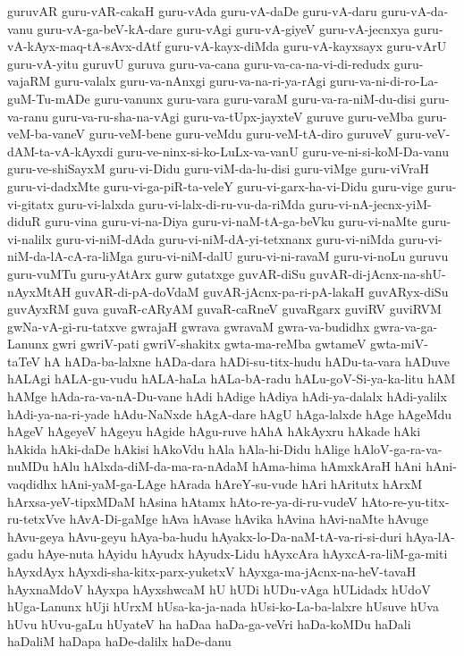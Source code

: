 {guruvAR
guru-vAR-cakaH
guru-vAda
guru-vA-daDe
guru-vA-daru
guru-vA-da-vanu
guru-vA-ga-beV-kA-dare
guru-vAgi
guru-vA-giyeV
guru-vA-jecnxya
guru-vA-kAyx-maq-tA-sAvx-dAtf
guru-vA-kayx-diMda
guru-vA-kayxsayx
guru-vArU
guru-vA-yitu
guruvU
guruva
guru-va-cana
guru-va-ca-na-vi-di-redudx
guru-vajaRM
guru-valalx
guru-va-nAnxgi
guru-va-na-ri-ya-rAgi
guru-va-ni-di-ro-La-guM-Tu-mADe
guru-vanunx
guru-vara
guru-varaM
guru-va-ra-niM-du-disi
guru-va-ranu
guru-va-ru-sha-na-vAgi
guru-va-tUpx-jayxteV
guruve
guru-veMba
guru-veM-ba-vaneV
guru-veM-bene
guru-veMdu
guru-veM-tA-diro
guruveV
guru-veV-dAM-ta-vA-kAyxdi
guru-ve-ninx-si-ko-LuLx-va-vanU
guru-ve-ni-si-koM-Da-vanu
guru-ve-shiSayxM
guru-vi-Didu
guru-viM-da-lu-disi
guru-viMge
guru-viVraH
guru-vi-dadxMte
guru-vi-ga-piR-ta-veleY
guru-vi-garx-ha-vi-Didu
guru-vige
guru-vi-gitatx
guru-vi-lalxda
guru-vi-lalx-di-ru-vu-da-riMda
guru-vi-nA-jecnx-yiM-diduR
guru-vina
guru-vi-na-Diya
guru-vi-naM-tA-ga-beVku
guru-vi-naMte
guru-vi-nalilx
guru-vi-niM-dAda
guru-vi-niM-dA-yi-tetxnanx
guru-vi-niMda
guru-vi-niM-da-lA-cA-ra-liMga
guru-vi-niM-dalU
guru-vi-ni-ravaM
guru-vi-noLu
guruvu
guru-vuMTu
guru-yAtArx
gurw
gutatxge
guvAR-diSu
guvAR-di-jAcnx-na-shU-nAyxMtAH
guvAR-di-pA-doVdaM
guvAR-jAcnx-pa-ri-pA-lakaH
guvARyx-diSu
guvAyxRM
guva
guvaR-cARyAM
guvaR-caRneV
guvaRgarx
guviRV
guviRVM
gwNa-vA-gi-ru-tatxve
gwrajaH
gwrava
gwravaM
gwra-va-budidhx
gwra-va-ga-Lanunx
gwri
gwriV-pati
gwriV-shakitx
gwta-ma-reMba
gwtameV
gwta-miV-taTeV
hA
hADa-ba-lalxne
hADa-dara
hADi-su-titx-hudu
hADu-ta-vara
hADuve
hALAgi
hALA-gu-vudu
hALA-haLa
hALa-bA-radu
hALu-goV-Si-ya-ka-litu
hAM
hAMge
hAda-ra-va-nA-Du-vane
hAdi
hAdige
hAdiya
hAdi-ya-dalalx
hAdi-yalilx
hAdi-ya-na-ri-yade
hAdu-NaNxde
hAgA-dare
hAgU
hAga-lalxde
hAge
hAgeMdu
hAgeV
hAgeyeV
hAgeyu
hAgide
hAgu-ruve
hAhA
hAkAyxru
hAkade
hAki
hAkida
hAki-daDe
hAkisi
hAkoVdu
hAla
hAla-hi-Didu
hAlige
hAloV-ga-ra-va-nuMDu
hAlu
hAlxda-diM-da-ma-ra-nAdaM
hAma-hima
hAmxkAraH
hAni
hAni-vaqdidhx
hAni-yaM-ga-LAge
hArada
hAreY-su-vude
hAri
hAritutx
hArxM
hArxsa-yeV-tipxMDaM
hAsina
hAtamx
hAto-re-ya-di-ru-vudeV
hAto-re-yu-titx-ru-tetxVve
hAvA-Di-gaMge
hAva
hAvase
hAvika
hAvina
hAvi-naMte
hAvuge
hAvu-geya
hAvu-geyu
hAya-ba-hudu
hAyakx-lo-Da-naM-tA-va-ri-si-duri
hAya-lA-gadu
hAye-nuta
hAyidu
hAyudx
hAyudx-Lidu
hAyxcAra
hAyxcA-ra-liM-ga-miti
hAyxdAyx
hAyxdi-sha-kitx-parx-yuketxV
hAyxga-ma-jAcnx-na-heV-tavaH
hAyxnaMdoV
hAyxpa
hAyxshwcaM
hU
hUDi
hUDu-vAga
hULidadx
hUdoV
hUga-Lanunx
hUji
hUrxM
hUsa-ka-ja-nada
hUsi-ko-La-ba-lalxre
hUsuve
hUva
hUvu
hUvu-gaLu
hUyateV
ha
haDaa
haDa-ga-veVri
haDa-koMDu
haDali
haDaliM
haDapa
haDe-dalilx
haDe-danu
}

